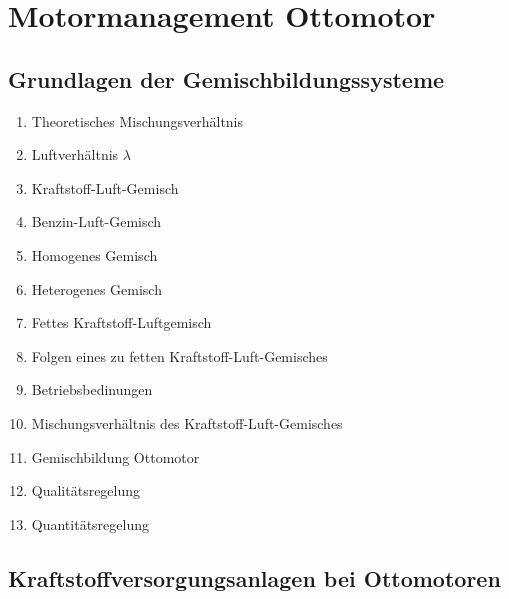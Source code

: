 \section{Motormanagement Ottomotor}\label{motormanagement-ottomotor}

\subsection{Grundlagen der
Gemischbildungssysteme}\label{grundlagen-der-gemischbildungssysteme}

\begin{enumerate}
\item
  Theoretisches Mischungsverhältnis\\
\item
  Luftverhältnis $\lambda$\\
\item
  Kraftstoff-Luft-Gemisch\\
\item
  Benzin-Luft-Gemisch\\
\item
  Homogenes Gemisch\\
\item
  Heterogenes Gemisch\\
\item
  Fettes Kraftstoff-Luftgemisch\\
\item
  Folgen eines zu fetten Kraftstoff-Luft-Gemisches\\
\item
  Betriebsbedinungen\\
\item
  Mischungsverhältnis des Kraftstoff-Luft-Gemisches\\
\item
  Gemischbildung Ottomotor\\
\item
  Qualitätsregelung\\
\item
  Quantitätsregelung
\end{enumerate}

\subsection{Kraftstoffversorgungsanlagen bei
Ottomotoren}\label{kraftstoffversorgungsanlagen-bei-ottomotoren}

